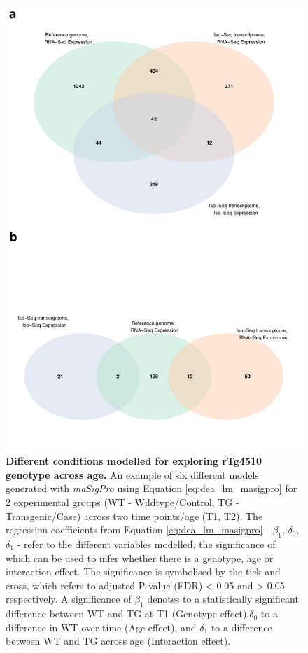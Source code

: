 \begin{figure}[!htp]
	\centering
	\includegraphics[page=2,trim={0 5cm 0 4cm},scale = 0.45]{Figures/WholeDifferentialAnalysis.pdf}
	\captionsetup{width=0.95\textwidth}
	\caption[Different conditions modelled for exploring rTg4510 genotype across age]%
	{\textbf{Different conditions modelled for exploring rTg4510 genotype across age.} An example of six different models generated with \textit{maSigPro} using Equation \cref{eq:dea_lm_masigpro} for 2 experimental groups (WT - Wildtype/Control, TG - Transgenic/Case) across two time points/age (T1, T2). The regression coefficients from Equation \cref{eq:dea_lm_masigpro} - $\beta_{1}$, $\delta_{0}$, $\delta_{1}$ - refer to the different variables modelled, the significance of which can be used to infer whether there is a genotype, age or interaction effect. The significance is symbolised by the tick and cross, which refers to adjusted P-value (FDR) < 0.05 and > 0.05 respectively. A significance of  $\beta_{1}$ denotes to a statistically significant difference between WT and TG at T1 (Genotype effect),$\delta_{0}$ to a difference in WT over time (Age effect), and $\delta_{1}$ to a difference between WT and TG across age (Interaction effect). \\\\
}
\end{figure}
